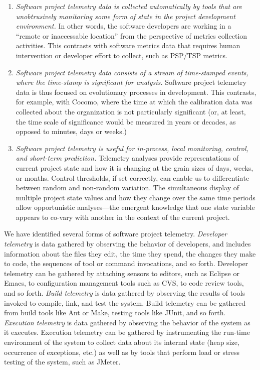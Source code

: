 \documentclass[11pt,twocolumn]{article}
\begin{document}
\begin{enumerate}

\item {\em Software project telemetry data is collected automatically by tools
   that are unobtrusively monitoring some form of state in the project
   development environment.}  In other words, the software developers are
   working in a ``remote or inaccessable location'' from the perspective of
   metrics collection activities. This contrasts with software metrics data
   that requires human intervention or developer effort to collect, such as
   PSP/TSP metrics.
        
\item {\em Software project telemetry data consists of a stream of time-stamped
   events, where the time-stamp is significant for analysis.} Software
   project telemetry data is thus focused on evolutionary processes in
   development.  This contrasts, for example, with Cocomo, where the time
   at which the calibration data was collected about the organization is
   not particularly significant (or, at least, the time scale of
   significance would be measured in years or decades, as opposed to
   minutes, days or weeks.)
        
\item {\em Software project telemetry is useful for in-process, local
   monitoring, control, and short-term prediction.} Telemetry analyses
   provide representations of current project state and how it is changing
   at the grain sizes of days, weeks, or months.  Control thresholds, if
   set correctly, can enable us to differentiate between random and
   non-random variation.  The simultaneous display of multiple project
   state values and how they change over the same time periods allow
   opportunistic analyses---the emergent knowledge that one state variable
   appears to co-vary with another in the context of the current project.

\end{enumerate}

We have identified several forms of software project telemetry.  {\em
Developer telemetry} is data gathered by observing the behavior of
developers, and includes information about the files they edit, the time
they spend, the changes they make to code, the sequences of tool or command
invocations, and so forth. Developer telemetry can be gathered by attaching
sensors to editors, such as Eclipse or Emacs, to configuration management
tools such as CVS, to code review tools, and so forth.  {\em Build
telemetry} is data gathered by observing the results of tools invoked to
compile, link, and test the system. Build telemetry can be gathered from
build tools like Ant or Make, testing tools like JUnit, and so forth.  {\em
Execution telemetry} is data gathered by observing the behavior of the
system as it executes. Execution telemetry can be gathered by instrumenting
the run-time environment of the system to collect data about its internal
state (heap size, occurrence of exceptions, etc.) as well as by tools that
perform load or stress testing of the system, such as JMeter.
\end{document}
